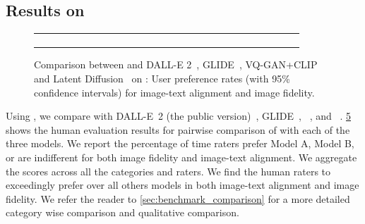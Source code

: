 \subsection{Results on \benchmarkname}
\vspace{-0.15cm}
\label{sec:experiments_drawbench}

\begin{figure}[tb]
    \centering
    \begin{tabularx}{\linewidth}{XXXX}
        \centering
        \begin{subfigure}[t]{0.25\textwidth}
        \centering
        \hspace*{-9pt}    
        \label{fig:drawit_vs_dalle2_drawbench}
        \end{subfigure} & 
        \begin{subfigure}[t]{0.25\textwidth}
        \centering
            
        \label{fig:drawit_vs_glide_drawbench}
        \end{subfigure} & 
        \begin{subfigure}[t]{0.25\textwidth}
        \centering
        
        \label{fig:drawit_vs_vaganclip_drawbench}
        \end{subfigure} &
        \begin{subfigure}[t]{0.25\textwidth}
        \centering
        
        \label{fig:drawit_vs_latentdiffusion_drawbench}
        \end{subfigure} \\
    \end{tabularx}
    \caption{Comparison between \name and DALL-E 2~\citep{ramesh-dalle2}, GLIDE~\citep{nichol-glide}, VQ-GAN+CLIP~\citep{crowson2022vqgan} and Latent Diffusion~\citep{rombach-cvpr-2022} on \benchmarkname: User preference rates (with 95\% confidence intervals) for image-text alignment and image fidelity.}
    \label{fig:drawbench-comparison}
    \vspace{-1em}
\end{figure}


Using \benchmarkname, we compare \name with \mbox{DALL-E 2} (the public version)~\cite{ramesh-dalle2}, \mbox{GLIDE}~\cite{nichol-glide}, \href{https://github.com/CompVis/latent-diffusion}{\color{black}{Latent Diffusion}}~\cite{rombach-cvpr-2022}, and \href{https://github.com/EleutherAI/vqgan-clip}{\color{black}{CLIP-guided VQ-GAN}}~\cite{crowson2022vqgan}. %
\cref{fig:drawbench-comparison} shows the human evaluation results for pairwise comparison of \name with each of the three models. We report the percentage of time raters prefer Model A, Model B, or are indifferent for both image fidelity and image-text alignment. We aggregate the scores across all the categories and raters. We find the human raters to exceedingly prefer \name over all others models in both image-text alignment and image fidelity. We refer the reader to \cref{sec:benchmark_comparison} for a more detailed category wise comparison and qualitative comparison. 
